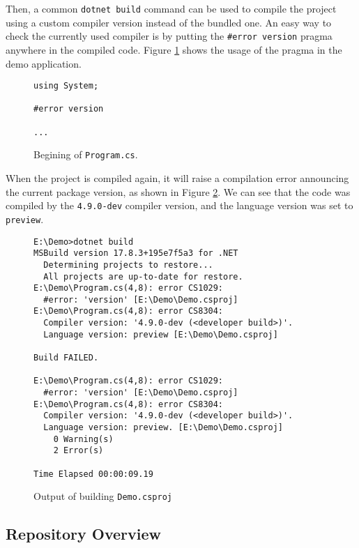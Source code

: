 \par
Then, a common \texttt{dotnet build} command can be used to compile the project using a custom compiler version instead of the bundled one. 
An easy way to check the currently used compiler is by putting the \texttt{\#error version} pragma anywhere in the compiled code. 
Figure \ref{img66:pragma} shows the usage of the pragma in the demo application.
\begin{figure}[h]
\begin{lstlisting}
using System;

#error version

...
\end{lstlisting}
\caption{Begining of \texttt{Program.cs}.}
\label{img66:pragma}
\end{figure}
\par
When the project is compiled again, it will raise a compilation error announcing the current package version, as shown in Figure \ref{img67:output}. 
We can see that the code was compiled by the \texttt{4.9.0-dev} compiler version, and the language version was set to \texttt{preview}.
\begin{figure}[h]
\begin{lstlisting}
E:\Demo>dotnet build
MSBuild version 17.8.3+195e7f5a3 for .NET
  Determining projects to restore...
  All projects are up-to-date for restore.
E:\Demo\Program.cs(4,8): error CS1029: 
  #error: 'version' [E:\Demo\Demo.csproj]
E:\Demo\Program.cs(4,8): error CS8304: 
  Compiler version: '4.9.0-dev (<developer build>)'. 
  Language version: preview [E:\Demo\Demo.csproj]

Build FAILED.

E:\Demo\Program.cs(4,8): error CS1029: 
  #error: 'version' [E:\Demo\Demo.csproj]
E:\Demo\Program.cs(4,8): error CS8304: 
  Compiler version: '4.9.0-dev (<developer build>)'. 
  Language version: preview. [E:\Demo\Demo.csproj]
    0 Warning(s)
    2 Error(s)

Time Elapsed 00:00:09.19
\end{lstlisting}
\caption{Output of building \texttt{Demo.csproj}}
\label{img67:output}
\end{figure}

\subsection{Repository Overview} \label{roslynRepo:overview}

